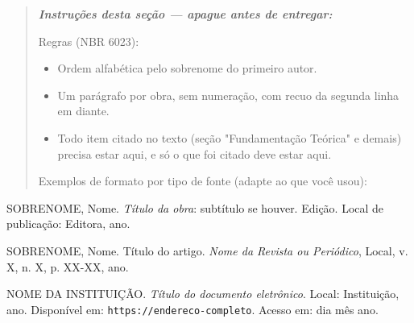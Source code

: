 \documentclass[article,12pt,a4paper]{abntex2}
\newenvironment{instrucoes}{%
  \begin{quotation}\footnotesize\itshape
  \noindent\textbf{\upshape Instruções desta seção — apague antes de entregar:}\par\smallskip
}{%
  \end{quotation}
}
\begin{document}
\begin{instrucoes}
Regras (NBR 6023):
\begin{itemize}
  \item Ordem alfabética pelo sobrenome do primeiro autor.
  \item Um parágrafo por obra, sem numeração, com recuo da segunda linha em diante.
  \item Todo item citado no texto (seção "Fundamentação Teórica" e demais) precisa estar aqui, e só o que foi citado deve estar aqui.
\end{itemize}
Exemplos de formato por tipo de fonte (adapte ao que você usou):
\end{instrucoes}

\newcommand{\referencia}[1]{\par\noindent\hangindent=1cm #1\par\medskip}

\referencia{SOBRENOME, Nome. \textit{Título da obra}: subtítulo se houver.
Edição. Local de publicação: Editora, ano.}

\referencia{SOBRENOME, Nome. Título do artigo. \textit{Nome da Revista ou
Periódico}, Local, v. X, n. X, p. XX-XX, ano.}

\referencia{NOME DA INSTITUIÇÃO. \textit{Título do documento eletrônico}.
Local: Instituição, ano. Disponível em: \texttt{https://endereco-completo}.
Acesso em: dia mês ano.}
\end{document}
